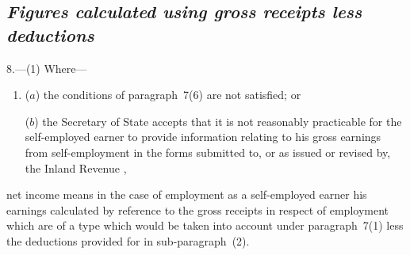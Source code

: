 \documentclass[12pt,a4paper]{article}
\begin{document}

\subsection*{\itshape Figures calculated using gross receipts less deductions}

8.---(1)  Where—
\begin{enumerate}\item[]
($a$) the conditions of paragraph~7(6) are not satisfied; or

($b$) the Secretary of State accepts that it is not reasonably practicable for the self-employed earner to provide information relating to his gross earnings from self-employment in the forms submitted to, or as issued or revised by, the Inland Revenue%
%
,
\end{enumerate}
net income means in the case of employment as a self-employed earner his earnings calculated by reference to the gross receipts 
in respect of employment which are of a type which would be taken into account under paragraph~7(1)  %
less the deductions provided for in sub-paragraph~(2).
\end{document}

